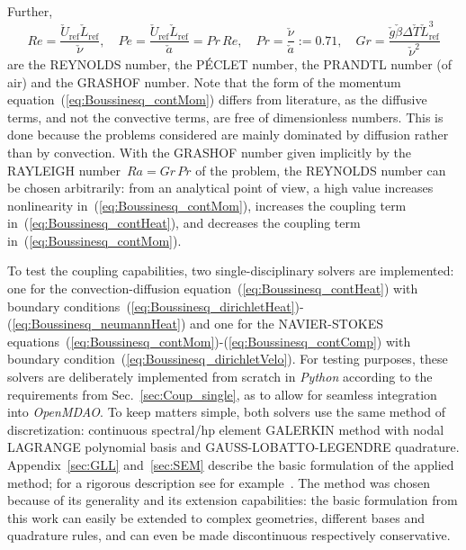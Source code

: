 \documentclass[10pt, ngerman, english,
twoside, open=right,
numbers=noenddot,
declaration=section,
abstract=section,
abstract=multiple,
abstract=notoc,
declaration=notoc,
cd=pale, 
chapterprefix=off, 
chapterpage=false, 
headingsvskip=-10em,
cdgeometry=custom, 
slantedgreek=on,
cdmath=on, 
cdfont=on,
ttfont=false,
mathswap=off,
]{tudscrreprt}
\numberwithin{equation}{chapter}
\renewcommand{\textsc}[1]{\uppercase{\mbox{#1}}}
\newcommand{\sidenote}[1]{
  \leavevmode %
  \marginpar{\hyphenpenalty=1000 \flushleft{\textcolor{HKS41}{#1}}}}
\begin{document}
Further,
\begin{equation}
Re=\frac{\check{U}_\text{ref}\check{L}_\text{ref}}{\check{\nu}}, \quad P\acute{e} = \frac{\check{U}_\text{ref}\check{L}_\text{ref}}{\check{a}} = Pr\,Re, \quad Pr=\frac{\check{\nu}}{\check{a}} := \num{0.71}, \quad Gr=\frac{\check{g}\check{\beta}\Delta\check{T}\check{L}_\text{ref}^3}{\check{\nu}^2}\label{eq:Boussinesq_dimless}
\end{equation}
are the \textsc{Reynolds} number, the \textsc{P\'{e}clet} number, the \textsc{Prandtl} number (of air) and the \textsc{Grashof} number.
Note that the form of the momentum equation~(\ref{eq:Boussinesq_contMom}) differs from literature, as the diffusive terms, and not the convective terms, are free of dimensionless numbers. 
This is done because the problems considered are mainly dominated by diffusion rather than by convection. With the \textsc{Grashof} number given implicitly by the \textsc{Rayleigh} number~$Ra = Gr\,Pr$ of the problem, the \textsc{Reynolds} number can be chosen arbitrarily: from an analytical point of view, a high value increases nonlinearity in~(\ref{eq:Boussinesq_contMom}), increases the coupling term in~(\ref{eq:Boussinesq_contHeat}), and decreases the coupling term in~(\ref{eq:Boussinesq_contMom}).\par
\sidenote{Single-Disciplinary Solvers}To test the coupling capabilities, two single-disciplinary solvers are implemented: one for the convection-diffusion equation~(\ref{eq:Boussinesq_contHeat}) with boundary conditions~\mbox{(\ref{eq:Boussinesq_dirichletHeat})-(\ref{eq:Boussinesq_neumannHeat})} and one for the \textsc{Navier}-\textsc{Stokes} equations~\mbox{(\ref{eq:Boussinesq_contMom})-(\ref{eq:Boussinesq_contComp})} with boundary condition~(\ref{eq:Boussinesq_dirichletVelo}). For testing purposes, these solvers are deliberately implemented from scratch in \textit{Python} according to the requirements from Sec.~\ref{sec:Coup_single}, as to allow for seamless integration into \textit{OpenMDAO}. To keep matters simple, both solvers use the same method of discretization: continuous spectral/hp element \textsc{Galerkin} method with nodal \textsc{Lagrange} polynomial basis and \textsc{Gau\ss}-\textsc{Lobatto}-\textsc{Legendre} quadrature. Appendix~\ref{sec:GLL} and~\ref{sec:SEM} describe the basic formulation of the applied method; for a rigorous description see for example~\cite{KarniadakisSpencer, Giraldo, DevilleFischer}. The method was chosen because of its generality and its extension capabilities: the basic formulation from this work can easily be extended to complex geometries, different bases and quadrature rules, and can even be made discontinuous respectively conservative.
\end{document}

